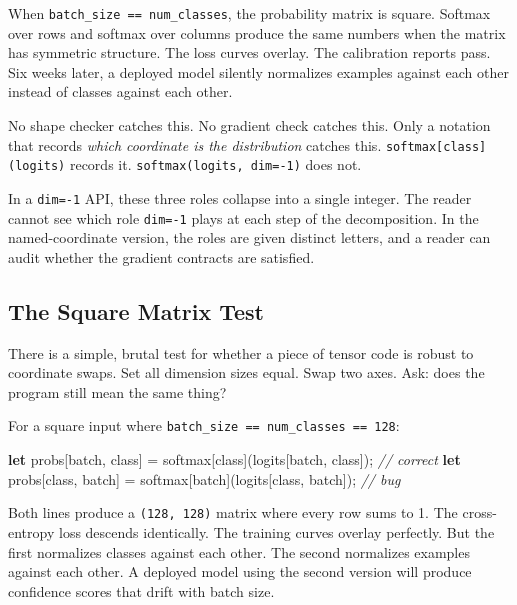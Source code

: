 \documentclass[11pt,]{article}
\newenvironment{Shaded}{}{}
\newcommand{\CommentTok}[1]{\textcolor[rgb]{0.38,0.63,0.69}{\textit{#1}}}
\newcommand{\KeywordTok}[1]{\textcolor[rgb]{0.00,0.44,0.13}{\textbf{#1}}}
\newcommand{\NormalTok}[1]{#1}
\newcommand{\OperatorTok}[1]{\textcolor[rgb]{0.40,0.40,0.40}{#1}}
\begin{document}
When \texttt{batch\_size\ ==\ num\_classes}, the probability matrix is
square. Softmax over rows and softmax over columns produce the same
numbers when the matrix has symmetric structure. The loss curves
overlay. The calibration reports pass. Six weeks later, a deployed model
silently normalizes examples against each other instead of classes
against each other.

No shape checker catches this. No gradient check catches this. Only a
notation that records \emph{which coordinate is the distribution}
catches this. \texttt{softmax{[}class{]}(logits)} records it.
\texttt{softmax(logits,\ dim=-1)} does not.

In a \texttt{dim=-1} API, these three roles collapse into a single
integer. The reader cannot see which role \texttt{dim=-1} plays at each
step of the decomposition. In the named-coordinate version, the roles
are given distinct letters, and a reader can audit whether the gradient
contracts are satisfied.

\hypertarget{the-square-matrix-test}{%
\subsection{The Square Matrix Test}\label{the-square-matrix-test}}

There is a simple, brutal test for whether a piece of tensor code is
robust to coordinate swaps. Set all dimension sizes equal. Swap two
axes. Ask: does the program still mean the same thing?

For a square input where
\texttt{batch\_size\ ==\ num\_classes\ ==\ 128}:

\begin{Shaded}
\begin{Highlighting}[]
\KeywordTok{let}\NormalTok{ probs}\OperatorTok{[}\NormalTok{batch, class}\OperatorTok{]}\NormalTok{ = softmax}\OperatorTok{[}\NormalTok{class}\OperatorTok{]}\NormalTok{(logits}\OperatorTok{[}\NormalTok{batch, class}\OperatorTok{]}\NormalTok{);   }\CommentTok{// correct}
\KeywordTok{let}\NormalTok{ probs}\OperatorTok{[}\NormalTok{class, batch}\OperatorTok{]}\NormalTok{ = softmax}\OperatorTok{[}\NormalTok{batch}\OperatorTok{]}\NormalTok{(logits}\OperatorTok{[}\NormalTok{class, batch}\OperatorTok{]}\NormalTok{);   }\CommentTok{// bug}
\end{Highlighting}
\end{Shaded}

Both lines produce a \texttt{(128,\ 128)} matrix where every row sums to
1. The cross-entropy loss descends identically. The training curves
overlay perfectly. But the first normalizes classes against each other.
The second normalizes examples against each other. A deployed model
using the second version will produce confidence scores that drift with
batch size.
\end{document}

